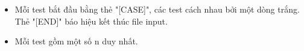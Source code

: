 \begin{itemize}
	\item     Mỗi test bắt đầu bằng thẻ "[CASE]", các test cách nhau bởi một dòng trắng. Thẻ "[END]" báo hiệu kết thúc file input.   
	\item     Mỗi test gồm một số n duy nhất.   
\end{itemize}